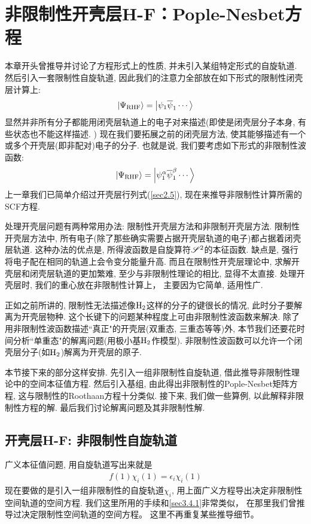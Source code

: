 \section{非限制性开壳层H-F：Pople-Nesbet方程}
本章开头曾推导并讨论了\hft 方程形式上的性质, 
并未引入某组特定形式的自旋轨道. 
然后引入一套限制性自旋轨道, 
因此我们的注意力全部放在如下形式的限制性闭壳层计算上:
\begin{align}
	\Ket{\Psi_\mathrm{RHF}} = \Ket{\psi_1\overline{\psi}_1\cdots}
\end{align}
显然并非所有分子都能用闭壳层轨道上的电子对来描述(即使是闭壳层分子本身, 
有些状态也不能这样描述.
) 现在我们要拓展之前的闭壳层方法, 
使其能够描述有一个或多个开壳层(即非配对)电子的分子. 
也就是说, 
我们要考虑如下形式的非限制性波函数:
\begin{align}
	\Ket{\Psi_\mathrm{RHF}} = \Ket{\psi_1^\alpha\overline{\psi}_1^\beta\cdots}
\end{align}
上一章我们已简单介绍过开壳层行列式(\ref{sec2.5}), 
现在来推导非限制性计算所需的SCF方程.


处理开壳层问题有两种常用办法: 限制性开壳层\hft 方法和非限制开壳层\hft 方法. 
限制性开壳层方法中, 
所有电子(除了那些确实需要占据开壳层轨道的电子)都占据着闭壳层轨道. 
这种办法的优点是, 
所得波函数是自旋算符$\mathscr{S}^2$的本征函数. 
缺点是, 
强行将电子配在相同的轨道上会令变分能量升高. 
而且在限制性开壳层\hft 理论中, 
求解开壳层和闭壳层轨道的更加繁难, 
至少与非限制性\hft 理论的相比, 
显得不太直接. 
处理开壳层时, 
我们的重心放在非限制性计算上， 
主要因为它简单, 
适用性广.


正如之前所讲的, 
限制性\hft  无法描述像$\mathrm{H}_2$这样的分子的键很长的情况, 
此时分子要解离为开壳层物种. 
这个长键下的问题某种程度上可由非限制性波函数来解决. 
除了用非限制性波函数描述``真正"的开壳层(双重态, 
三重态等等)外, 
本节我们还要花时间分析``单重态"的解离问题(用极小基$\mathrm{H}_2$作模型). 
非限制性波函数可以允许一个闭壳层分子(如$\mathrm{H}_2$)解离为开壳层的原子.


本节接下来的部分这样安排. 
先引入一组非限制性自旋轨道, 
借此推导非限制性\hft 理论中的空间本征值方程. 
然后引入基组, 
由此得出非限制性的Pople-Nesbet矩阵方程, 
这与限制性的Roothaan方程十分类似. 
接下来, 
我们做一些算例, 
以此解释非限制性方程的解. 
最后我们讨论解离问题及其非限制性解.

\subsection{开壳层H-F: 非限制性自旋轨道}
广义\hft 本征值问题, 
用自旋轨道写出来就是
\begin{align}
	f(1)\chi_i(1) = \epsilon_i \chi_i(1)
\end{align}
现在要做的是引入一组非限制性的自旋轨道$\chi_i$, 
用上面广义\hft 方程导出决定非限制性空间轨道的空间方程. 
我们这里所用的手续和\ref{sec3.4.1}非常类似，
在那里我们曾推导过决定限制性空间轨道的空间方程。
这里不再重复某些推导细节。


